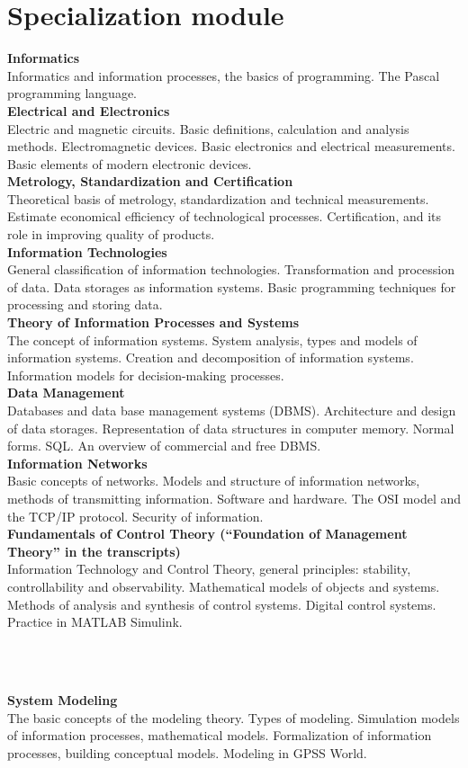 \documentclass[a4paper, 12pt]{article}
\newcommand{\group}[1] {\section{#1}}
\newcommand{\discipline}[1] {\textbf{#1} \\ }
\newcommand{\desc}[1] { #1 \\ }
\begin{document}
\group{Specialization module}

\discipline{Informatics}
\desc{Informatics and information processes, the basics of programming. The Pascal programming language.}

\discipline{Electrical and Electronics}
\desc{Electric and magnetic circuits. Basic definitions, calculation and analysis methods. Electromagnetic devices. Basic electronics and electrical measurements. Basic elements of modern electronic devices.}

\discipline{Metrology, Standardization and Certification}
\desc{Theoretical basis of metrology, standardization and technical measurements. Estimate economical efficiency of technological processes. Certification, and its role in improving quality of products.}

\discipline{Information Technologies}
\desc{General classification of information technologies. Transformation and procession of data. Data storages as information systems. Basic programming techniques for processing and storing data.}

\discipline{Theory of Information Processes and Systems}
\desc{The concept of information systems. System analysis, types and models of information systems. Creation and decomposition of information systems. Information models for decision-making processes.}

\discipline{Data Management}
\desc{Databases and data base management systems (DBMS). Architecture and design of data storages. Representation of data structures in computer memory. Normal forms. SQL. An overview of commercial and free DBMS.}

\discipline{Information Networks}
\desc{Basic concepts of networks. Models and structure of information networks, methods of transmitting information. Software and hardware. The OSI model and the TCP/IP protocol. Security of information.}

\discipline{Fundamentals of Control Theory (``Foundation of Management Theory'' in the transcripts)}
\desc{Information Technology and Control Theory, general principles: stability, controllability and observability. Mathematical models of objects and systems. Methods of analysis and synthesis of control systems. Digital control systems. Practice in MATLAB Simulink.}

\

\

\discipline{System Modeling}
\desc{The basic concepts of the modeling theory. Types of modeling. Simulation models of information processes, mathematical models. Formalization of information processes, building conceptual models. Modeling in GPSS World.}
\end{document}
